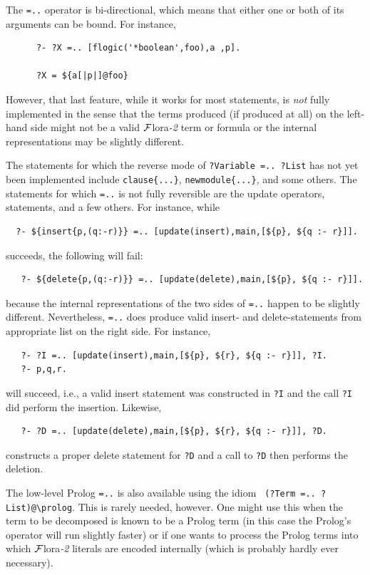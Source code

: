 \documentclass[11pt]{article}
\newcommand{\FLORA}{{\mbox{\sc ${\cal F}${lora}\rm\emph{-2}}}\xspace}
\newcommand{\FLSYSTEM}{\FLORA}
\newcommand{\bs}{\textbackslash}
\begin{document}
The {\tt =..} operator is bi-directional, which means that either one or
both of its arguments can be bound. For instance, 
\begin{verbatim}
      ?- ?X =.. [flogic('*boolean',foo),a ,p].
 
      ?X = ${a[|p|]@foo}
\end{verbatim}
However, that last feature, while it works for most statements,
is \emph{not} fully implemented in the sense
that the terms produced (if produced at all) on the left-hand side might
not be a valid \FLSYSTEM term or formula or the internal representations
may be slightly different.

The statements for which the reverse mode of \texttt{?Variable =.. ?List}
has not yet been
implemented include \texttt{clause\{...\}},  \texttt{newmodule\{...\}},
and some others. The
statements for which \texttt{=..} is not fully reversible are the update
operators, statements, and a few others. For instance, while
\begin{verbatim}
  ?- ${insert{p,(q:-r)}} =.. [update(insert),main,[${p}, ${q :- r}]].
\end{verbatim}
succeeds, the following will fail:
\begin{verbatim}
   ?- ${delete{p,(q:-r)}} =.. [update(delete),main,[${p}, ${q :- r}]].
\end{verbatim}
because the internal representations of the two sides of \texttt{=..}
happen to be slightly different. 
Nevertheless, \texttt{=..} does produce valid insert- and
delete-statements from appropriate list on the right side. For instance,
\begin{verbatim}
   ?- ?I =.. [update(insert),main,[${p}, ${r}, ${q :- r}]], ?I.
   ?- p,q,r.
\end{verbatim}
will succeed, i.e., a valid insert statement was constructed in \texttt{?I}
and the call \texttt{?I} did perform the insertion. Likewise,
\begin{verbatim}
   ?- ?D =.. [update(delete),main,[${p}, ${r}, ${q :- r}]], ?D.
\end{verbatim}
constructs a proper delete statement for \texttt{?D} and a call to
\texttt{?D} then performs the deletion.  


The low-level Prolog {\tt =..} is also available using the idiom {\tt
  (?Term =.. ?List)@\bs{}prolog}.  This is rarely needed, however. One
might use this when the term to be decomposed is known to be a Prolog term
(in this case the Prolog's operator will run slightly faster) or if one
wants to process the Prolog terms into which \FLSYSTEM literals are encoded
internally (which is probably hardly ever necessary).
\end{document}
